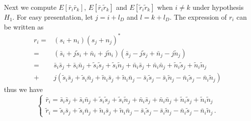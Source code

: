 Next we compute $E[\bar{r}_i\bar{r}_k]$, $E[\bar{r}_i\tilde{r}_k]$ and $E[\tilde{r}_i\tilde{r}_k]$ when $i \neq k$ under hypothesis $H_1$. For easy presentation, let $j = i+l_D$ and $l=k+l_D$.
 The expression of $r_i$ can be written as
\begin{equation}
  \begin{split}
    r_i = &(s_i+n_i)(s_j + n_j)^\ast\\
    = &(\bar{s}_i+j\tilde{s}_i + \bar{n}_i+j\tilde{n}_i)(\bar{s}_j-j\tilde{s}_j + \bar{n}_j-j\tilde{n}_j)\\
    = &\bar{s}_i\bar{s}_j + \bar{s}_i\bar{n}_j +\tilde{s}_i\tilde{s}_j+\tilde{s}_i\tilde{n}_j + \bar{n}_i\bar{s}_j+\bar{n}_i\bar{n}_j+\tilde{n}_i\tilde{s}_j+\tilde{n}_i\tilde{n}_j\\
    + &j\left( \tilde{s}_i\bar{s}_j + \tilde{s}_i\bar{n}_j + \tilde{n}_i\bar{s}_j + \tilde{n}_i\bar{n}_j - \bar{s}_i\tilde{s}_j - \bar{s}_i\tilde{n}_j - \bar{n}_i\tilde{s}_j - \bar{n}_i\tilde{n}_j \right)
  \end{split}
\end{equation}
thus we have 
\begin{equation}
  \begin{cases}
    \bar{r}_i = \bar{s}_i\bar{s}_j + \bar{s}_i\bar{n}_j +\tilde{s}_i\tilde{s}_j+\tilde{s}_i\tilde{n}_j + \bar{n}_i\bar{s}_j+\bar{n}_i\bar{n}_j+\tilde{n}_i\tilde{s}_j+\tilde{n}_i\tilde{n}_j\\
    \tilde{r}_i = \tilde{s}_i\bar{s}_j + \tilde{s}_i\bar{n}_j + \tilde{n}_i\bar{s}_j + \tilde{n}_i\bar{n}_j - \bar{s}_i\tilde{s}_j - \bar{s}_i\tilde{n}_j - \bar{n}_i\tilde{s}_j - \bar{n}_i\tilde{n}_j\,.
  \end{cases}
  \label{RrIr}
\end{equation}


